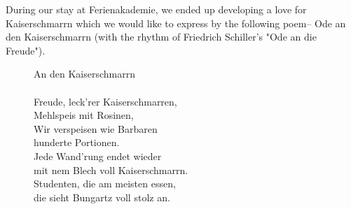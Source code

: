 During our stay at Ferienakademie, we ended up developing a love for Kaiserschmarrn which we would like to express by the following poem-- Ode an den Kaiserschmarrn (with the rhythm of Friedrich Schiller's "Ode an die Freude"). 
\begin{figure}[ht]
\begin{framed}
An den Kaiserschmarrn 
\\
\\
Freude, leck'rer Kaiserschmarren,\\
Mehlspeis mit Rosinen,\\
Wir verspeisen wie Barbaren \\
hunderte Portionen.\\

Jede Wand'rung endet wieder \\
mit nem Blech voll Kaiserschmarrn.\\
Studenten, die am meisten essen,\\
die sieht Bungartz voll stolz an.
\end{framed}
\end{figure}
